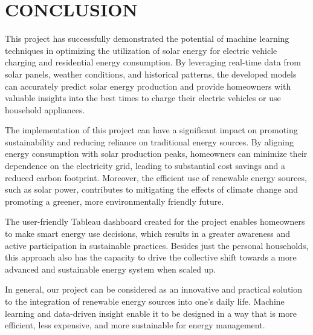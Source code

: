 \documentclass[conference]{IEEEtran}
\begin{document}
\section{CONCLUSION}
This project has successfully demonstrated the potential of machine learning techniques in optimizing the utilization of solar energy for electric vehicle charging and residential energy consumption. By leveraging real-time data from solar panels, weather conditions, and historical patterns, the developed models can accurately predict solar energy production and provide homeowners with valuable insights into the best times to charge their electric vehicles or use household appliances.

The implementation of this project can have a significant impact on promoting sustainability and reducing reliance on traditional energy sources. By aligning energy consumption with solar production peaks, homeowners can minimize their dependence on the electricity grid, leading to substantial cost savings and a reduced carbon footprint. Moreover, the efficient use of renewable energy sources, such as solar power, contributes to mitigating the effects of climate change and promoting a greener, more environmentally friendly future.

The user-friendly Tableau dashboard created for the project enables homeowners to make smart energy use decisions, which results in a greater awareness and active participation in sustainable practices. Besides just the personal households, this approach also has the capacity to drive the collective shift towards a more advanced and sustainable energy system when scaled up.

In general, our project can be considered as an innovative and practical solution to the integration of renewable energy sources into one’s daily life. Machine learning and data-driven insight enable it to be designed in a way that is more efficient, less expensive, and more sustainable for energy management.
\end{document}
